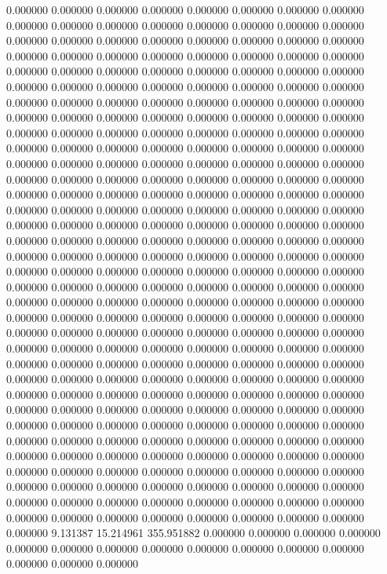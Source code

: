 0.000000 0.000000 0.000000
0.000000 0.000000 0.000000
0.000000 0.000000 0.000000
0.000000 0.000000 0.000000
0.000000 0.000000 0.000000
0.000000 0.000000 0.000000
0.000000 0.000000 0.000000
0.000000 0.000000 0.000000
0.000000 0.000000 0.000000
0.000000 0.000000 0.000000
0.000000 0.000000 0.000000
0.000000 0.000000 0.000000
0.000000 0.000000 0.000000
0.000000 0.000000 0.000000
0.000000 0.000000 0.000000
0.000000 0.000000 0.000000
0.000000 0.000000 0.000000
0.000000 0.000000 0.000000
0.000000 0.000000 0.000000
0.000000 0.000000 0.000000
0.000000 0.000000 0.000000
0.000000 0.000000 0.000000
0.000000 0.000000 0.000000
0.000000 0.000000 0.000000
0.000000 0.000000 0.000000
0.000000 0.000000 0.000000
0.000000 0.000000 0.000000
0.000000 0.000000 0.000000
0.000000 0.000000 0.000000
0.000000 0.000000 0.000000
0.000000 0.000000 0.000000
0.000000 0.000000 0.000000
0.000000 0.000000 0.000000
0.000000 0.000000 0.000000
0.000000 0.000000 0.000000
0.000000 0.000000 0.000000
0.000000 0.000000 0.000000
0.000000 0.000000 0.000000
0.000000 0.000000 0.000000
0.000000 0.000000 0.000000
0.000000 0.000000 0.000000
0.000000 0.000000 0.000000
0.000000 0.000000 0.000000
0.000000 0.000000 0.000000
0.000000 0.000000 0.000000
0.000000 0.000000 0.000000
0.000000 0.000000 0.000000
0.000000 0.000000 0.000000
0.000000 0.000000 0.000000
0.000000 0.000000 0.000000
0.000000 0.000000 0.000000
0.000000 0.000000 0.000000
0.000000 0.000000 0.000000
0.000000 0.000000 0.000000
0.000000 0.000000 0.000000
0.000000 0.000000 0.000000
0.000000 0.000000 0.000000
0.000000 0.000000 0.000000
0.000000 0.000000 0.000000
0.000000 0.000000 0.000000
0.000000 0.000000 0.000000
0.000000 0.000000 0.000000
0.000000 0.000000 0.000000
0.000000 0.000000 0.000000
0.000000 0.000000 0.000000
0.000000 0.000000 0.000000
0.000000 0.000000 0.000000
0.000000 0.000000 0.000000
0.000000 0.000000 0.000000
0.000000 0.000000 0.000000
0.000000 0.000000 0.000000
0.000000 0.000000 0.000000
0.000000 0.000000 0.000000
0.000000 0.000000 0.000000
0.000000 0.000000 0.000000
0.000000 0.000000 0.000000
0.000000 0.000000 0.000000
0.000000 0.000000 0.000000
0.000000 0.000000 0.000000
0.000000 0.000000 0.000000
0.000000 0.000000 0.000000
0.000000 0.000000 0.000000
0.000000 0.000000 0.000000
0.000000 0.000000 0.000000
0.000000 0.000000 0.000000
0.000000 0.000000 0.000000
0.000000 0.000000 0.000000
0.000000 0.000000 0.000000
0.000000 0.000000 0.000000
0.000000 0.000000 0.000000
0.000000 0.000000 0.000000
9.131387 15.214961 355.951882
0.000000 0.000000 0.000000
0.000000 0.000000 0.000000
0.000000 0.000000 0.000000
0.000000 0.000000 0.000000
0.000000 0.000000 0.000000
